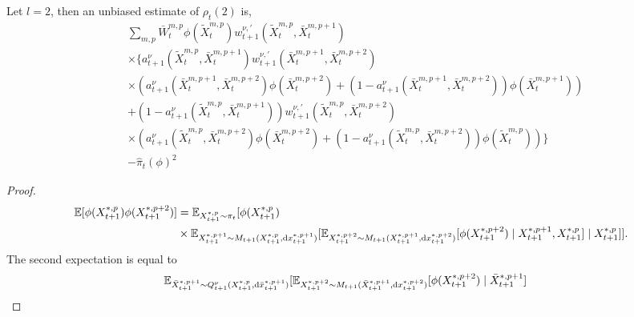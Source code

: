 \begin{proposition}
    Let $l=2$, then an unbiased estimate of $\rho_t(2)$ is,
    \begin{equation}
        \begin{split}
            &\sum_{m,p}\bar{W}_t^{m,p}\phi(\tilde{X}_t^{m,p})  w_{t+1}^{\nu, '}(\tilde{X}_t^{m,p}, \bar{X}_{t}^{m,p+1})\\
            &\times \{a_{t+1}^{\nu}(\tilde{X}_{t}^{m,p}, \bar{X}_{t}^{m,p+1}) w_{t+1}^{\nu, '}(\bar{X}_{t}^{m,p+1}, \bar{X}_{t}^{m,p+2})\\
            &\times( a_{t+1}^{\nu}(\bar{X}_{t}^{m,p+1}, \bar{X}_{t}^{m,p+2}) \phi(\bar{X}_{t}^{m,p+2}) + (1-a_{t+1}^{\nu}(\bar{X}_{t}^{m,p+1}, \bar{X}_{t}^{m,p+2}))\phi(\bar{X}_{t}^{m,p+1})) \\
            &+(1-a_{t+1}^{\nu}(\tilde{X}_{t}^{m,p}, \bar{X}_{t}^{m,p+1})) w_{t+1}^{\nu, '}(\tilde{X}_{t}^{m,p}, \bar{X}_{t}^{m,p+2})\\
            &\times( a_{t+1}^{\nu}(\tilde{X}_{t}^{m,p}, \bar{X}_{t}^{m,p+2}) \phi(\bar{X}_{t}^{m,p+2}) + (1-a_{t+1}^{\nu}(\tilde{X}_{t}^{m,p}, \bar{X}_{t}^{m,p+2}))\phi(\tilde{X}_{t}^{m,p}))
            \}\\
            &-\hat{\pi}_t(\phi)^2
        \end{split}
    \end{equation}
    \begin{proof}
        \begin{equation}
            \label{eq:exp_order2}
            \begin{split}
                \mathbb{E}[\phi(X^{*,p}_{t+1})\phi(X^{*,p+2}_{t+1})]&=\mathbb{E}_{X_{t+1}^{*,p}\sim \pi_t}[\phi(X^{*,p}_{t+1})\\
                &\times \mathbb{E}_{X_{t+1}^{*,p+1}\sim M_{t+1}(X_{t+1}^{*,p}, \mathrm{d} x_{t+1}^{*,p+1})}[\mathbb{E}_{X_{t+1}^{*,p+2}\sim M_{t+1}(X_{t+1}^{*,p+1},\mathrm{d} x_{t+1}^{*,p+2})}[\phi(X_{t+1}^{*,p+2})\mid X_{t+1}^{*,p+1}, X_{t+1}^{*,p}]\mid X_{t+1}^{*,p}]].
            \end{split}
        \end{equation}
        The second expectation is equal to
        \begin{equation}
            \label{eq:second_exp}
            \begin{split}
                &\bbE_{\bar{X}_{t+1}^{*,p+1}\sim Q_{t+1}^{\nu}(X_{t+1}^{*,p}, \dd \bar{x}_{t+1}^{*,p+1})}[
                \bbE_{X_{t+1}^{*,p+2}\sim M_{t+1}(\bar{X}_{t+1}^{*,p+1},\dd x_{t+1}^{*,p+2})}[\phi(X_{t+1}^{*,p+2})\mid \bar{X}_{t+1}^{*,p+1}]

\end{split}
\end{equation}
\end{proof}
\end{proposition}
